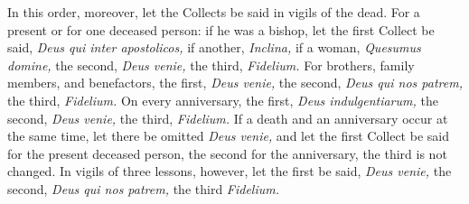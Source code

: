 \documentclass[openany]{book}
\renewcommand{\\}{\par\hspace*{.25em}} %
\renewcommand{\newline}{\par}
\begin{document}
\newline In this order, moreover, let the Collects be said in vigils of the dead. For a present or for one deceased person: if he was a bishop, let the first Collect be said, \emph{Deus qui inter apostolicos,} if another, \emph{Inclina,} if a woman, \emph{Quesumus domine,} the second, \emph{Deus venie,} the third, \emph{Fidelium.}
For brothers, family members, and benefactors, the first, \emph{Deus venie,} the second, \emph{Deus qui nos patrem,} the third, \emph{Fidelium.}
On every anniversary, the first, \emph{Deus indulgentiarum,} the second, \emph{Deus venie,} the third, \emph{Fidelium.}
If a death and an anniversary occur at the same time, let there be omitted \emph{Deus venie,} and let the first Collect be said for the present deceased person, the second for the anniversary, the third is not changed. In vigils of three lessons, however, let the first be said, \emph{Deus venie,} the second, \emph{Deus qui nos patrem,} the third \emph{Fidelium.}
\end{document}

